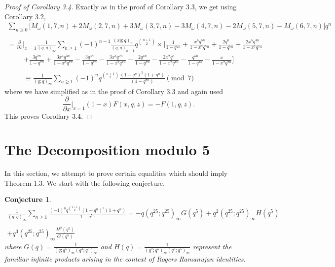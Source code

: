 \documentclass[10pt,reqno]{amsart}
\newtheorem{conjecture}[theorem]{Conjecture}
\begin{document}
\begin{proof}[Proof of Corollary 3.4]
Exactly as in the proof of Corollary 3.3, we get using Corollary 3.2,
\begin{multline*}
        \displaystyle\sum_{n\geq 0}\big[M_{\omega}(1,7,n)+2M_{\omega}(2,7,n)+3M_{\omega}(3,7,n)-3M_{\omega}(4,7,n)-2M_{\omega}(5,7,n)-M_{\omega}(6,7,n)\big]q^n \\ \\ 
        =\displaystyle\frac{\partial}{\partial x}\Bigr\rvert_{x = 1}\displaystyle\frac{1}{(q;q)_{\infty}}\displaystyle\sum_{n\geq 1}(-1)^{n-1}\displaystyle\frac{(xq;q)_n}{(q;q)_{n-1}}q^{\binom{n+1}{2}} \times 
        \Bigg[\displaystyle\frac{1}{1-q^{7n}}+\displaystyle\frac{x^6q^{5n}}{1-x^7q^{7n}}+\displaystyle\frac{2q^n}{1-q^{7n}}+\displaystyle\frac{2x^5q^{4n}}{1-x^7q^{7n}}
\end{multline*}
\begin{multline*}
        +\displaystyle\frac{3q^{2n}}{1-q^{7n}}+\displaystyle\frac{3x^4q^{3n}}{1-x^7q^{7n}}-\displaystyle\frac{3q^{3n}}{1-q^{7n}}-\displaystyle\frac{3x^3q^{2n}}{1-x^7q^{7n}}-\displaystyle\frac{2q^{4n}}{1-q^{7n}}-\displaystyle\frac{2x^2q^n}{1-x^7q^{7n}}-\displaystyle\frac{q^{5n}}{1-q^{7n}}-\displaystyle\frac{x}{1-x^7q^{7n}}\Bigg] \\ \\
        \equiv \displaystyle\frac{1}{(q;q)_{\infty}}\displaystyle\sum_{n\geq 1}(-1)^nq^{\binom{n+1}{2}}\displaystyle\frac{(1-q^n)^5(1+q^n)}{(1-q^{7n})}\pmod 7
\end{multline*}
where we have simplified as in the proof of Corollary 3.3 and again used $$\displaystyle\frac{\partial}{\partial x}\Bigr\rvert_{x = 1}(1-x)F(x,q,z)=-F(1,q,z).$$ This proves Corollary 3.4.
\end{proof}
\section{The Decomposition modulo 5}
In this section, we attempt to prove certain equalities which should imply Theorem 1.3. We start with the following conjecture.
\begin{conjecture}
\begin{align*}
    \displaystyle\frac{1}{(q;q)_{\infty}}\displaystyle\sum_{n\geq 1}\displaystyle\frac{(-1)^nq^{\binom{n+1}{2}}(1-q^n)^3(1+q^n)}{1-q^{5n}} 
    =-q(q^{25};q^{25})_{\infty}G(q^5)+q^2(q^{25};q^{25})_{\infty}H(q^5)\\ \\+q^3(q^{25};q^{25})_{\infty}\displaystyle\frac{H^2(q^5)}{G(q^5)}
\end{align*}
where $G(q)=\displaystyle\frac{1}{(q;q^5)_{\infty}(q^4;q^5)_{\infty}}$ and $H(q)=\displaystyle\frac{1}{(q^2;q^5)_{\infty}(q^3;q^5)_{\infty}}$ represent the familiar infinite products arising in the context of Rogers Ramanujan identities.
\end{conjecture}
\end{document}

